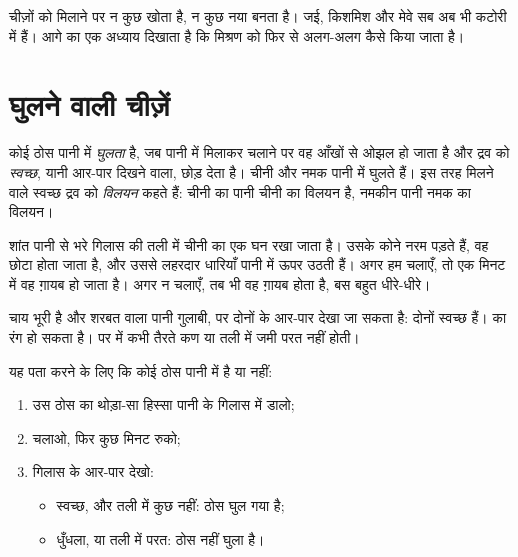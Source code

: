 \begin{remark}[मिलाने से कुछ नष्ट नहीं होता]\label{rem:g2:mixing-and-dissolving:nothing-lost}
चीज़ों को मिलाने पर न कुछ खोता है, न कुछ नया बनता है। जई, किशमिश और
मेवे सब अब भी कटोरी में हैं। आगे का एक अध्याय दिखाता है कि मिश्रण को
फिर से अलग-अलग कैसे किया जाता है।
\end{remark}

\section{घुलने वाली चीज़ें}

\begin{definition}[घुलना और विलयन]\label{def:g2:mixing-and-dissolving:dissolve}
कोई ठोस पानी में \emph{घुलता} है, जब पानी में मिलाकर
चलाने पर वह आँखों से ओझल हो जाता है और द्रव को \emph{स्वच्छ}, यानी
आर-पार दिखने वाला, छोड़ देता है। चीनी और नमक पानी में घुलते हैं।
इस तरह मिलने वाले स्वच्छ द्रव को
\emph{विलयन} कहते हैं: चीनी का पानी चीनी का विलयन है,
नमकीन पानी नमक का विलयन।
\end{definition}

\begin{example}[पानी के गिलास में चीनी का घन]\label{ex:g2:mixing-and-dissolving:cube}
शांत पानी से भरे गिलास की तली में चीनी का एक घन रखा जाता है। उसके
कोने नरम पड़ते हैं, वह छोटा होता जाता है, और उससे लहरदार धारियाँ पानी
में ऊपर उठती हैं। अगर हम चलाएँ, तो एक मिनट में वह ग़ायब हो जाता है।
अगर न चलाएँ, तब भी वह ग़ायब होता है, बस बहुत धीरे-धीरे।
\end{example}

\begin{remark}[स्वच्छ का अर्थ रंगहीन नहीं]\label{rem:g2:mixing-and-dissolving:clear}
चाय भूरी है और शरबत वाला पानी गुलाबी, पर दोनों के आर-पार देखा जा
सकता है: दोनों स्वच्छ हैं।  का रंग हो सकता है। पर  में कभी
तैरते कण या तली में जमी परत नहीं होती।
\end{remark}

\begin{method}[क्या यह घुलता है?]\label{met:g2:mixing-and-dissolving:test}
यह पता करने के लिए कि कोई ठोस पानी में  है या नहीं:
\begin{enumerate}
  \item उस ठोस का थोड़ा-सा हिस्सा पानी के गिलास में डालो;
  \item चलाओ, फिर कुछ मिनट रुको;
  \item गिलास के आर-पार देखो:
    \begin{itemize}
      \item स्वच्छ, और तली में कुछ नहीं: ठोस घुल गया है;
      \item धुँधला, या तली में परत: ठोस नहीं घुला है।
    \end{itemize}
\end{enumerate}
\end{method}

